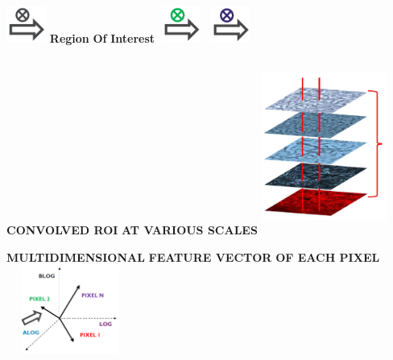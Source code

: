 \documentclass[portrait,final,a0paper]{baposter}
\begin{document}
\begin{poster}
{\begin{minipage}{.10\textwidth}
    \includegraphics[width=1.3cm, height=1.2cm]{convolution2}
    \newline 
    \color{primary1}\textbf{Region}
    \newline 
    \color{primary1} \hspace{0.3cm}\textbf{Of}
    \newline
    \textbf{Interest}
    \includegraphics[width=1.5cm, height=1.2cm]{convolution3}
    \includegraphics[width=1.5cm, height=1.2cm]{convolution4}
\end{minipage}
\begin{minipage}{.18\textwidth}
\color{primary1} \hspace{0.1cm}\textbf{CONVOLVED ROI}
\newline
\textbf{AT VARIOUS SCALES}
\newline
\includegraphics[width=4.1cm, height=5.8cm]{filteredImage}	
\end{minipage}
\begin{minipage}{.18\textwidth}
	\color{black}\textbf{MULTIDIMENSIONAL}
	\newline
	\color{black}\hspace{0.3cm}\textbf{FEATURE VECTOR}
	\newline
	\color{black}\hspace{0.3cm}\textbf{ OF EACH PIXEL}
	\newline
	\includegraphics[width=4.2cm, height=2.9cm]{vector}	

\end{minipage}}
\end{poster}
\end{document}
